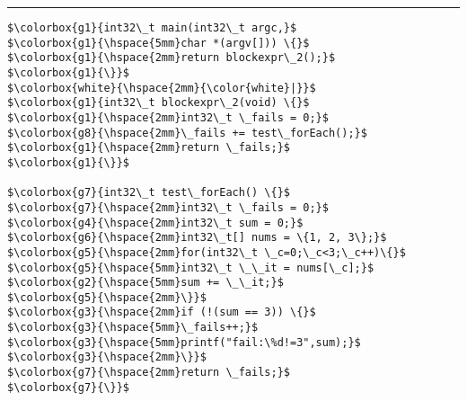 \hfill 
\rule[-67ex]{0.2ex}{30.2em}
\begin{minipage}[t]{130pt} 
\begin{lstlisting}[language=mbeddr]
$\colorbox{g1}{int32\_t main(int32\_t argc,}$
$\colorbox{g1}{\hspace{5mm}char *(argv[])) \{}$
$\colorbox{g1}{\hspace{2mm}return blockexpr\_2();}$
$\colorbox{g1}{\}}$  
$\colorbox{white}{\hspace{2mm}{\color{white}|}}$
$\colorbox{g1}{int32\_t blockexpr\_2(void) \{}$
$\colorbox{g1}{\hspace{2mm}int32\_t \_fails = 0;}$
$\colorbox{g8}{\hspace{2mm}\_fails += test\_forEach();}$
$\colorbox{g1}{\hspace{2mm}return \_fails;}$
$\colorbox{g1}{\}}$

$\colorbox{g7}{int32\_t test\_forEach() \{}$
$\colorbox{g7}{\hspace{2mm}int32\_t \_fails = 0;}$
$\colorbox{g4}{\hspace{2mm}int32\_t sum = 0;}$
$\colorbox{g6}{\hspace{2mm}int32\_t[] nums = \{1, 2, 3\};}$
$\colorbox{g5}{\hspace{2mm}for(int32\_t \_c=0;\_c<3;\_c++)\{}$
$\colorbox{g5}{\hspace{5mm}int32\_t \_\_it = nums[\_c];}$
$\colorbox{g2}{\hspace{5mm}sum += \_\_it;}$
$\colorbox{g5}{\hspace{2mm}\}}$
$\colorbox{g3}{\hspace{2mm}if (!(sum == 3)) \{}$
$\colorbox{g3}{\hspace{5mm}\_fails++;}$
$\colorbox{g3}{\hspace{5mm}printf("fail:\%d!=3",sum);}$
$\colorbox{g3}{\hspace{2mm}\}}$
$\colorbox{g7}{\hspace{2mm}return \_fails;}$
$\colorbox{g7}{\}}$
\end{lstlisting}
\end{minipage} 
\begin{lstlisting}[caption=Example mbeddr program with foreach and unit test
(left column) and generated C code (right column),
language=mbeddr,label=lst:generatedForEach]
\end{lstlisting}

